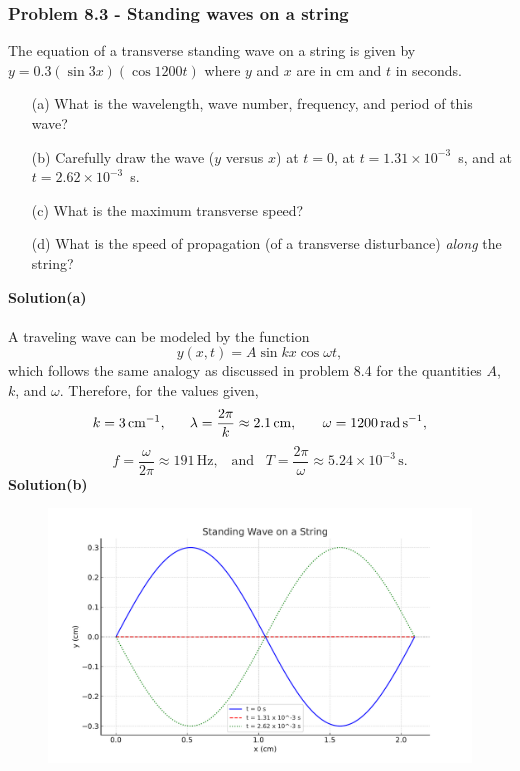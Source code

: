 \documentclass{article}
\begin{document}
\subsubsection*{Problem 8.3 - Standing waves on a string}
The equation of a transverse standing wave on a string is given by $y=0.3(\sin3x)(\cos1200t)$ where $y$ and $x$ are in cm and $t$ in seconds.
\begin{enumerate}
    \item[(a)]What is the wavelength, wave number, frequency, and period of this wave?
    \item[(b)]Carefully draw the wave ($y$ versus $x$) at $t=0$, at $t=1.31\times10^{-3}\,$ s, and at $t=2.62\times10^{-3}\,$ s.
    \item[(c)]What is the maximum transverse speed?
    \item[(d)]What is the speed of propagation (of a transverse disturbance) \textit{along} the string?
\end{enumerate}
\textbf{Solution(a)}
\\
\\A traveling wave can be modeled by the function
\begin{equation}
    y(x,t)=A\sin kx\cos\omega t,
\end{equation}
which follows the same analogy as discussed in problem 8.4 for the quantities $A$, $k$, and $\omega$. Therefore, for the values given, 
\[k=3\,\text{cm}^{-1},\,\,\,\,\,\,\,\,\,\,\lambda=\frac{2\pi}{k}\approx2.1\,\text{cm},\,\,\,\,\,\,\,\,\,\,\,\omega=1200\,\text{rad\,s}^{-1},\]
\[f=\frac{\omega}{2\pi}\approx191\,\text{Hz},\,\,\,\,\,\text{and}\,\,\,\,\,T=\frac{2\pi}{\omega}\approx5.24\times10^{-3}\,\text{s}.\]
\textbf{Solution(b)}
\begin{figure}[h]
    \centering
    \includegraphics[width=0.95\linewidth]{figs/fig_sol_8.3b.pdf}
\end{figure}
\end{document}
